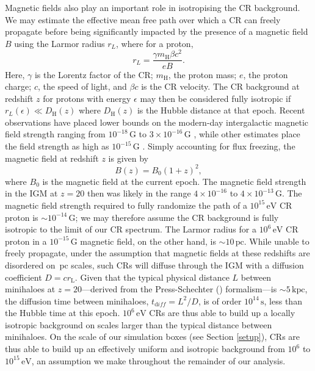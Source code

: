 \documentclass{thesis}
\newcommand{\s}{\ensuremath{\,\mathrm{s}}\xspace}
\newcommand{\kpc}{\ensuremath{\,\mathrm{kpc}}\xspace}
\newcommand{\pc}{\ensuremath{\,\mathrm{pc}}\xspace}
\newcommand{\ev}{\ensuremath{\,\mathrm{eV}}\xspace}
\newcommand{\mh}{m_{\mathrm{H}}}
\newcommand{\Dhubble}{D_{\mathrm{H}}}
\begin{document}
Magnetic fields also play an important role in isotropising the CR background.  
We may estimate the effective mean free path over which a CR can freely propagate before being significantly impacted by the presence of a magnetic field $B$ using the Larmor radius $r_L$, where for a proton, 
\begin{equation}
r_L = \frac{\gamma \mh \beta c^2}{eB}.
\end{equation}
Here, $\gamma$ is the Lorentz factor of the CR; $\mh$, the proton mass; $e$, the proton charge; $c$, the speed of light, and $\beta c$ is the CR velocity. 
The CR background at redshift $z$ for protons with energy $\epsilon$ may then be considered fully isotropic if $r_L(\epsilon) \ll \Dhubble(z)$ where $\Dhubble(z)$ is the Hubble distance at that epoch. 
Recent observations have placed lower bounds on the modern-day intergalactic magnetic field strength ranging from $10^{-18}\,$G \citep{Dermeretal2011} to $3\times10^{-16}\,$G \citep{NeronovVovk2010}, while other estimates place the field strength as high as $10^{-15}\,$G \citep{AndoKusenko2010}.  
Simply accounting for flux freezing, the magnetic field at redshift $z$ is given by
\begin{equation}
B(z) = B_0 (1+z)^2,
\end{equation}
where $B_0$ is the magnetic field at the current epoch. 
The magnetic field strength in the IGM at $z=20$ then was likely in the range $4\times10^{-16}$ to $4\times10^{-13}\,$G.  
The magnetic field strength required to fully randomize the path of a $10^{15}\ev$ CR proton is $\sim$$10^{-14}\,$G; we may therefore assume the CR background is fully isotropic to the limit of our CR spectrum.  
The Larmor radius for a $10^6\ev$ CR proton in a $10^{-15}\,$G magnetic field, on the other hand, is $\sim$$10\pc$.  
While unable to freely propagate, under the assumption that magnetic fields at these redshifts are disordered on $\pc$ scales, such CRs will diffuse through the IGM with a diffusion coefficient $D = c r_{\mathrm L}$.  
Given that the typical physical distance $L$ between minihaloes at $z=20$---derived from the Press-Schechter (\citeyear{PressSchechter1974}) formalism---is $\sim$$5\kpc$, the diffusion time between minihaloes, $t_{\mathrm diff} = L^2/D$, is of order $10^{14}\s$, less than the Hubble time at this epoch.
$10^6\ev$ CRs are thus able to build up a locally isotropic background on scales larger than the typical distance between minihaloes.
On the scale of our simulation boxes (see Section \ref{setup}), CRs are thus able to build up an effectively uniform and isotropic background from $10^6$ to $10^{15}\ev$, an assumption we make throughout the remainder of our analysis.
\end{document}
